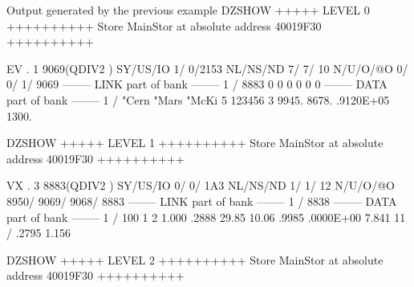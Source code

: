 \begin{Listing}{Output generated by the previous example}
DZSHOW  +++++ LEVEL     0 ++++++++++            Store  MainStor at absolute address 40019F30      ++++++++++                     
                                                                                                                                 
 EV  .     1     9069(QDIV2   ) SY/US/IO    1/    0/2153 NL/NS/ND    7/    7/      10 N/U/O/@O       0/       0/       1/    9069
--------  LINK part of bank  --------                                                                                            
      1 /        8883           0           0           0           0           0           0                                    
--------  DATA part of bank  --------                                                                                            
      1 /       "Cern       "Mars       "McKi           5      123456           3   9945.       8678.       .9120E+05   1300.    
                                                                                                                                 
DZSHOW  +++++ LEVEL     1 ++++++++++            Store  MainStor at absolute address 40019F30      ++++++++++                     
                                                                                                                                 
 VX  .     3     8883(QDIV2   ) SY/US/IO    0/    0/ 1A3 NL/NS/ND    1/    1/      12 N/U/O/@O    8950/    9069/    9068/    8883
--------  LINK part of bank  --------                                                                                            
      1 /        8838                                                                                                            
--------  DATA part of bank  --------                                                                                            
      1 /         100           1           2   1.000       .2888       29.85       10.06       .9985       .0000E+00   7.841    
     11 /   .2795       1.156                                                                                                    
                                                                                                                                 
DZSHOW  +++++ LEVEL     2 ++++++++++            Store  MainStor at absolute address 40019F30      ++++++++++                     
                                                                                                                                 

\end{Listing}
